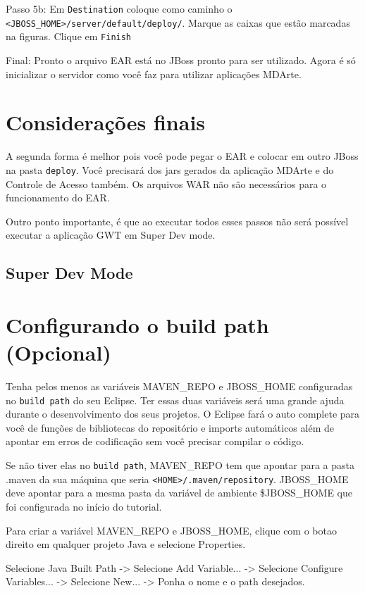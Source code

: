 Passo 5b: Em \texttt{Destination} coloque como caminho o \texttt{<JBOSS\_HOME>/server/default/deploy/}. Marque as caixas que estão
marcadas na figuras. Clique em \texttt{Finish}

Final: Pronto o arquivo EAR está no JBoss pronto para ser utilizado. Agora é só inicializar o servidor como você faz para utilizar
aplicações MDArte.

\section{Considerações finais}

A segunda forma é melhor pois você pode pegar o EAR e colocar em outro JBoss na pasta \texttt{deploy}. Você precisará dos jars
gerados da aplicação MDArte e do Controle de Acesso também. Os arquivos WAR não são necessários para o funcionamento do EAR.

Outro ponto importante, é que ao executar todos esses passos não será possível executar a aplicação GWT em Super Dev mode.

\subsection{Super Dev Mode}


\section{Configurando o build path (Opcional)}

Tenha pelos menos as variáveis MAVEN\_REPO e JBOSS\_HOME configuradas no \texttt{build path} do seu Eclipse. Ter essas duas
variáveis será uma grande ajuda durante o desenvolvimento dos seus projetos. O Eclipse fará o auto complete para você de funções de bibliotecas
do repositório e imports automáticos além de apontar em erros de codificação sem você precisar compilar o código.

Se não tiver elas no \texttt{build path}, MAVEN\_REPO tem que apontar para a pasta .maven da sua máquina que seria
\texttt{<HOME>/.maven/repository}. JBOSS\_HOME deve apontar para a mesma pasta da variável de ambiente \$JBOSS\_HOME que foi
configurada no início do tutorial.

Para criar a variável MAVEN\_REPO e JBOSS\_HOME, clique com o botao direito em qualquer projeto Java e selecione Properties.

Selecione Java Built Path -> Selecione Add Variable... -> Selecione Configure Variables... -> Selecione New... -> Ponha o nome e o path desejados.

